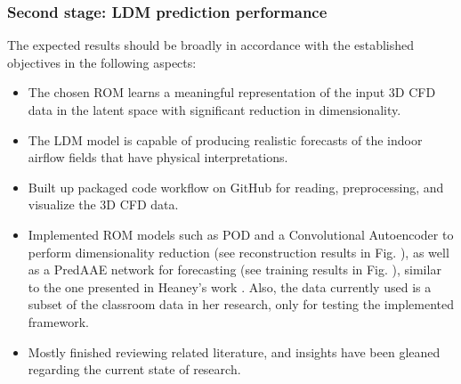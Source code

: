 \documentclass[final-report]{article-template}
\begin{document}
\subsubsection{Second stage: LDM prediction performance}
The expected results should be broadly in accordance with the established objectives in the following aspects:
\begin{itemize}
    \item The chosen ROM learns a meaningful representation of the input 3D CFD data in the latent space with significant reduction in dimensionality.
    \item The LDM model is capable of producing realistic forecasts of the indoor airflow fields that have physical interpretations.
\end{itemize}


\begin{itemize}
    \item Built up packaged code workflow on GitHub for reading, preprocessing, and visualize the 3D CFD data.
    \item Implemented ROM models such as POD and a Convolutional Autoencoder to perform dimensionality reduction (see reconstruction results in Fig. ), as well as a PredAAE network for forecasting (see training results in Fig. ), similar to the one presented in Heaney's work \cite{heaney2024data}. Also, the data currently used is a subset of the classroom data in her research, only for testing the implemented framework.
    \item Mostly finished reviewing related literature, and insights have been gleaned regarding the current state of research.
\end{itemize}
\end{document}
